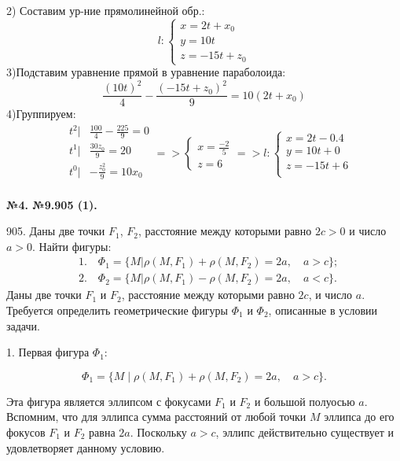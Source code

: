 \documentclass[a4paper,14pt]{extreport} %
\begin{document}
2) Составим ур-ние прямолинейной обр.: 
\[
  l: \begin{cases}
    x = 2t + x_0\\ 
    y = 10t \\
    z = -15t + z_0
  \end{cases}
\]
3)Подставим уравнение прямой в уравнение параболоида:
\[
  \frac{(10t)^2}{4} - \frac{(-15t+z_0)^2}{9} = 10(2t+x_0)
\]
4)Группируем: 
\[
\begin{aligned}
  &t^2|   &\frac{100}{4} - \frac{225}{9} = 0\\
  &t^1|   &\frac{30z_0}{9}=20\\
  &t^0|  &-\frac{z_0^2}{9} = 10x_0\\
\end{aligned} =>
  \begin{cases}
    x = \frac{-2}{5}\\ 
    z = 6 
  \end{cases} =>l: \begin{cases}
    x = 2t-0.4\\ 
    y = 10t+0\\ 
    z = -15t +6\\
  \end{cases}
\]  




\textbf{№4. №9.905 (1).}

905. Даны две точки $F_1$, $F_2$, расстояние между которыми равно $2c > 0$ и число $a > 0$. Найти фигуры:
\[
\begin{aligned}
    &1. \quad \Phi_1 = \{M | \rho(M, F_1) + \rho(M, F_2) = 2a, \quad a > c\}; \\
    &2. \quad \Phi_2 = \{M | \rho(M, F_1) - \rho(M, F_2) = 2a, \quad a < c\}.
\end{aligned}
\]
Даны две точки \( F_1 \) и \( F_2 \), расстояние между которыми равно \( 2c \), и число \( a \). Требуется определить геометрические фигуры \( \Phi_1 \) и \( \Phi_2 \), описанные в условии задачи.

1. Первая фигура \( \Phi_1 \):

   \[
   \Phi_1 = \{ M \mid \rho(M, F_1) + \rho(M, F_2) = 2a, \quad a > c \}.
   \]

   Эта фигура является эллипсом с фокусами \( F_1 \) и \( F_2 \) и большой полуосью \( a \). Вспомним, что для эллипса сумма расстояний от любой точки \( M \) эллипса до его фокусов \( F_1 \) и \( F_2 \) равна \( 2a \). Поскольку \( a > c \), эллипс действительно существует и удовлетворяет данному условию. 
\end{document}
